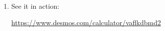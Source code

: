 \documentclass[12pt,noauthor,nooutcomes, instructornotes]{ximera}
\begin{document}
\begin{question}
\begin{enumerate}
\item See it in action:

\begin{center}
    \url{https://www.desmos.com/calculator/vaflkdbmd2}
\end{center}



\end{enumerate}
\end{question}
\end{document}
